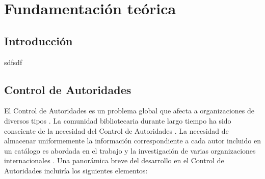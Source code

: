 \chapter{\large Fundamentación teórica}

\pagestyle{fancy}
\lhead{}
\chead{}
\lfoot{}
\cfoot{}
\rfoot{\thepage}
\renewcommand{\headrulewidth}{0.4pt}
 \vspace{-1cm}

\section{Introducción}
sdfsdf
\section{Control de Autoridades}
El Control de Autoridades es un problema global que afecta a organizaciones de diversos tipos \citep{Leiva-Mederos2013}. La comunidad bibliotecaria durante largo tiempo ha sido consciente de la necesidad del Control de Autoridades \citep{Harper2007,Tillett2009,Leiva-Mederos2013,Carrasco2016}. La necesidad de almacenar uniformemente la información correspondiente a cada autor incluido en un catálogo es abordada en el trabajo y la investigación de varias organizaciones internacionales \citep{Leiva-Mederos2013}. Una panorámica breve del desarrollo en el Control de Autoridades incluiría los siguientes elementos:

